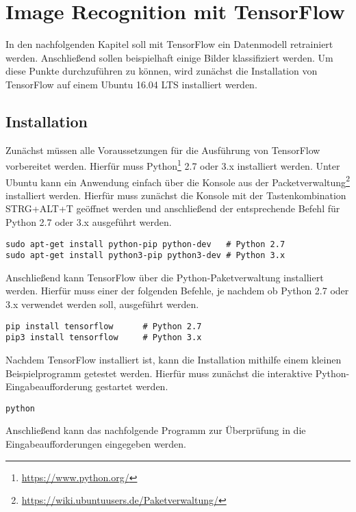 \section{Image Recognition mit TensorFlow}
\label{sec:Praxis}
In den nachfolgenden Kapitel soll mit TensorFlow ein Datenmodell retrainiert werden. Anschließend sollen beispielhaft einige Bilder klassifiziert werden. Um diese Punkte durchzuführen zu können, wird zunächst die Installation von TensorFlow auf einem Ubuntu 16.04 LTS installiert werden.

\subsection{Installation}
\label{subsec:inst}
Zunächst müssen alle Voraussetzungen für die Ausführung von TensorFlow vorbereitet werden. Hierfür muss Python\footnote{\url{https://www.python.org/}} 2.7 oder 3.x installiert werden. Unter Ubuntu kann ein Anwendung einfach über die Konsole aus der Packetverwaltung\footnote{\url{https://wiki.ubuntuusers.de/Paketverwaltung/}} installiert werden. Hierfür muss zunächst die Konsole mit der Tastenkombination \glqq{}STRG+ALT+T\grqq{} geöffnet werden und anschließend der entsprechende Befehl für Python 2.7 oder 3.x ausgeführt werden.

\begin{lstlisting}[frame=single]
sudo apt-get install python-pip python-dev   # Python 2.7
sudo apt-get install python3-pip python3-dev # Python 3.x
\end{lstlisting}

Anschließend kann TensorFlow über die Python-Paketverwaltung installiert werden. Hierfür muss einer der folgenden Befehle, je nachdem ob Python 2.7 oder 3.x verwendet werden soll, ausgeführt werden.

\begin{lstlisting}[frame=single]
pip install tensorflow      # Python 2.7
pip3 install tensorflow     # Python 3.x
\end{lstlisting}

Nachdem TensorFlow installiert ist, kann die Installation mithilfe einem kleinen Beispielprogramm getestet werden. Hierfür muss zunächst die interaktive Python-Eingabeaufforderung gestartet werden.

\begin{lstlisting}[frame=single]
python
\end{lstlisting}

Anschließend kann das nachfolgende Programm zur Überprüfung in die Eingabeaufforderungen eingegeben werden.

